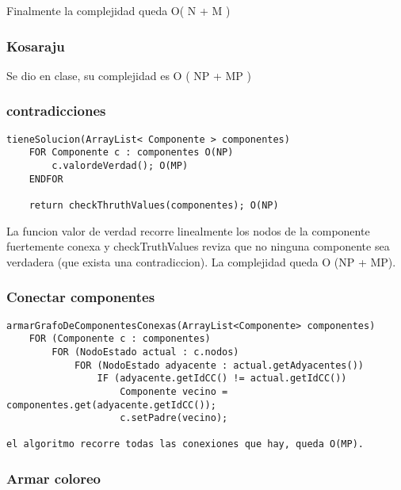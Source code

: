 Finalmente la complejidad queda O( N + M )

\subsubsection {Kosaraju}
Se dio en clase, su complejidad es O ( NP + MP )

\subsubsection {contradicciones}

\begin{verbatim}
tieneSolucion(ArrayList< Componente > componentes)
    FOR Componente c : componentes O(NP)
        c.valordeVerdad(); O(MP)
    ENDFOR
	
    return checkThruthValues(componentes); O(NP)
\end{verbatim}
		
La funcion valor de verdad recorre linealmente los nodos de la componente fuertemente conexa y checkTruthValues reviza que no ninguna componente sea verdadera (que exista una contradiccion). La complejidad queda O (NP + MP).

\pagebreak
\subsubsection {Conectar componentes}
\begin{verbatim}
armarGrafoDeComponentesConexas(ArrayList<Componente> componentes)
    FOR (Componente c : componentes)
        FOR (NodoEstado actual : c.nodos)
            FOR (NodoEstado adyacente : actual.getAdyacentes())
                IF (adyacente.getIdCC() != actual.getIdCC())
                    Componente vecino = componentes.get(adyacente.getIdCC()); 
                    c.setPadre(vecino);

el algoritmo recorre todas las conexiones que hay, queda O(MP).
\end{verbatim}

\subsubsection {Armar coloreo}

